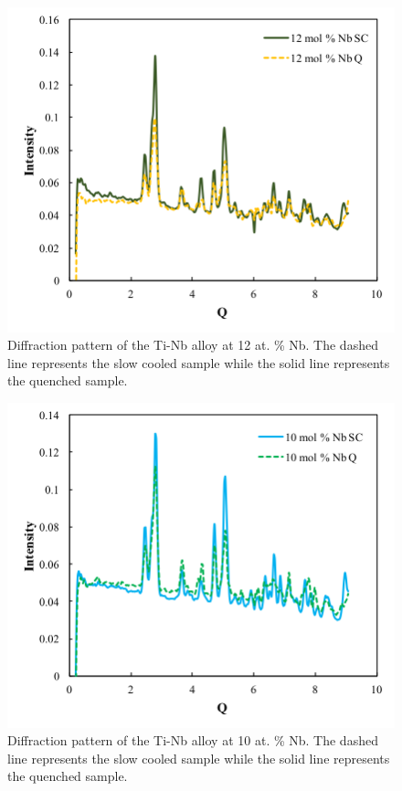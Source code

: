 \pagebreak
\begin{figure}[H]
	\centering
	\includegraphics[width=\textwidth]{Chapter-7/Figures/50diff12.png}
	\caption{Diffraction pattern of the Ti-Nb alloy at 12 at. \% Nb. The dashed line represents the slow cooled sample while the solid line represents the quenched sample.}
	\label{Ch7-figure:50diff12}
\end{figure}

\pagebreak
\begin{figure}[H]
	\centering
	\includegraphics[width=\textwidth]{Chapter-7/Figures/50diff10.png}
	\caption{Diffraction pattern of the Ti-Nb alloy at 10 at. \% Nb. The dashed line represents the slow cooled sample while the solid line represents the quenched sample.}
	\label{Ch7-figure:50diff10}
\end{figure}